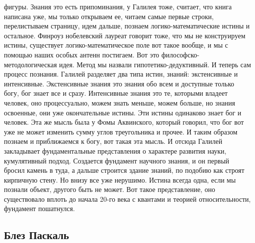 \documentclass[a4paper, 12pt]{article}
\begin{document}
фигуры. Знания это есть припоминания, у Галилея тоже, считает, что книга 
написана уже, мы только открываем ее, читаем самые первые строки, 
перелистываем страницу, идем дальше, познаем логико-математические 
истины и остальное. Финроуз нобелевский лауреат говорит тоже, что мы не 
конструируем истины, существует логико-математическое поле вот такое 
вообще, и мы с помощью наших особых антенн постигаем. Вот это 
философско-методологическая идея. Метод мы назвали 
гипотетико-дедуктивный. И теперь сам процесс познания. Галилей разделяет 
два типа истин, знаний: экстенсивные и интенсивные. Экстенсивные знания 
это знания обо всем и доступные только богу, бог знает все и сразу. 
Интенсивные знания это те, которыми владеет человек, оно процессуально, 
можем знать меньше, можем больше, но знания освоенные, они уже 
окончательные истины. Эти истины одинаково знает бог и человек. Эта же 
мысль была у Фомы Аквинского, который говорил, что бог вот уже не может 
изменить сумму углов треугольника и прочее. И таким образом познаем 
и приближаемся к богу, вот такая эта мысль. И отсюда Галилей закладывает 
фундаментальные представления о характере развития науки, кумулятивный 
подход. Создается фундамент научного знания, и он первый бросил камень 
в туда, а дальше строится здание знаний, по подобию как строят кирпичную 
стену. Но внизу все уже нерушимо. Истина всегда одна, если мы познали 
объект, другого быть не может. Вот такое представление, оно существовало 
вплоть до начала 20-го века с квантами и теорией относительности, 
фундамент пошатнулся.

\subsection{Блез Паскаль}
\end{document}
